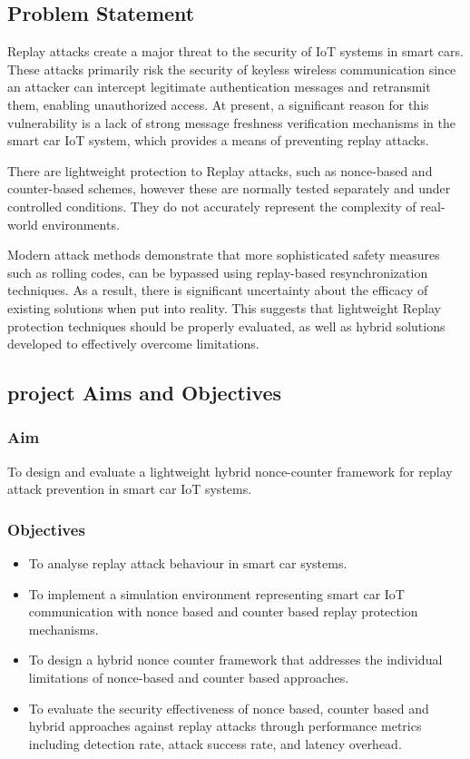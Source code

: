 \documentclass[a4paper,man,12pt]{article}
\begin{document}
\subsection{Problem Statement}

Replay attacks create a major threat to the security of IoT systems in smart cars. These attacks primarily risk the security of keyless wireless communication since an attacker can intercept legitimate authentication messages and retransmit them, enabling unauthorized access. At present, a significant reason for this vulnerability is a lack of strong message freshness verification mechanisms in the smart car IoT system, which provides a means of preventing replay attacks.\bigbreak

There are lightweight protection to Replay attacks, such as nonce-based and counter-based schemes, however these are normally tested separately and under controlled conditions. They do not accurately represent the complexity of real-world environments.\bigbreak

Modern attack methods demonstrate that more sophisticated safety measures such as rolling codes, can be bypassed using replay-based resynchronization techniques. As a result, there is significant uncertainty about the efficacy of existing solutions when put into reality. This suggests that lightweight Replay protection techniques should be properly evaluated, as well as hybrid solutions developed to effectively overcome limitations.

\subsection{project Aims and Objectives}

\subsubsection{Aim}

To design and evaluate a lightweight hybrid nonce-counter framework for replay attack prevention in smart car IoT systems.


\subsubsection{Objectives}

\begin{itemize}
  \item To analyse replay attack behaviour in smart car systems.
    \item To implement a simulation environment representing smart car IoT communication with nonce based and counter based replay protection mechanisms.
     \item To design a hybrid nonce counter framework that addresses the individual limitations of nonce-based and counter based approaches.
          \item To evaluate the security effectiveness of nonce based, counter based and hybrid approaches against replay attacks through performance metrics including detection rate, attack success rate, and latency overhead.
          \end{itemize}
\end{document}
